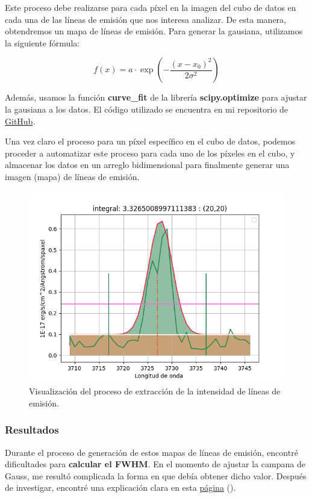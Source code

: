 \documentclass[10pt,twocolumn,a4paper]{opticajnl}
\begin{document}
Este proceso debe realizarse para cada píxel en la imagen del cubo de datos en cada una de las líneas de emisión que nos interesa analizar. De esta manera, obtendremos un mapa de líneas de emisión. Para generar la gausiana, utilizamos la siguiente fórmula:

$$
f(x) = a \cdot \exp\left( -\frac{(x - x_0)^2}{2\sigma^2} \right)
$$

Además, usamos la función \textbf{curve\_fit} de la librería \textbf{scipy.optimize} para ajustar la gausiana a los datos. El código utilizado se encuentra en mi repositorio de \href{https://github.com/renatosanz/delfin}{GitHub}.

Una vez claro el proceso para un píxel específico en el cubo de datos, podemos proceder a automatizar este proceso para cada uno de los píxeles en el cubo, y almacenar los datos en un arreglo bidimensional para finalmente generar una imagen (mapa) de líneas de emisión.

\begin{figure}
    \centering
    \includegraphics[width=1\linewidth]{extraccion_linea.png}
    \caption{Visualización del proceso de extracción de la intensidad de líneas de emisión.}
    \label{fig:extraccion_linea}
\end{figure}

\subsubsection*{Resultados}

Durante el proceso de generación de estos mapas de líneas de emisión, encontré dificultades para \textbf{calcular el FWHM}. En el momento de ajustar la campana de Gauss, me resultó complicada la forma en que debía obtener dicho valor. Después de investigar, encontré una explicación clara en esta \href{https://www.pulstec.net/what-is-full-width-at-half-maximum/}{página} (\cite{suzuki2023fwhm}).
\end{document}
